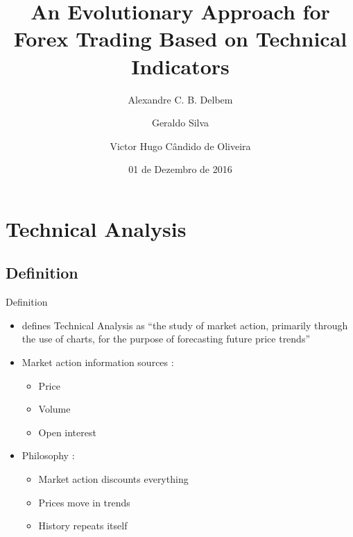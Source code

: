 \documentclass[12pt,portuguese]{beamer}
\title{An Evolutionary Approach for Forex Trading Based on Technical Indicators}
\author[Delbem, A. C. B.]{Alexandre C. B. Delbem \inst{1} \\
	\and Geraldo Silva \inst{2} \\
	\and Victor Hugo Cândido de Oliveira \inst{1}}
\institute[ICMC/USP]{\inst{1} ICMC/USP \and %
                      \inst{2} IBILCE/UNESP}
\date{01 de Dezembro de 2016}
\begin{document}

\maketitle

\section{Technical Analysis}
\subsection{Definition}
\begin{frame}{Definition}
\begin{itemize}
	\item \citet{Murphy1999} defines Technical Analysis as ``the study of market action, primarily through the use of charts, for the purpose of forecasting future price trends''

		\pause
	\item Market action information sources \citep{Murphy1999}:
	\begin{itemize}
		\item Price
		\item Volume
		\item Open interest
	\end{itemize}

		\pause
	\item Philosophy \citep{Murphy1999}:
	\begin{itemize}
		\item Market action discounts everything
		\item Prices move in trends
		\item History repeats itself
	\end{itemize}
\end{itemize}
\end{frame}
\end{document}
